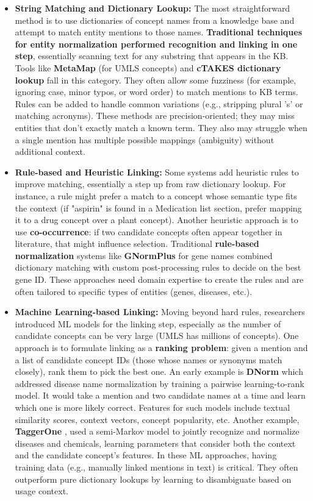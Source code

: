 \begin{itemize}
\item \textbf{String Matching and Dictionary Lookup:} The most straightforward method is to use dictionaries of concept names from a knowledge base and attempt to match entity mentions to those names. \textbf{Traditional techniques for entity normalization performed recognition and linking in one step}, essentially scanning text for any substring that appears in the KB. Tools like \textbf{MetaMap} (for UMLS concepts) and \textbf{cTAKES dictionary lookup} fall in this category. They often allow some fuzziness (for example, ignoring case, minor typos, or word order) to match mentions to KB terms. Rules can be added to handle common variations (e.g., stripping plural 's' or matching acronyms). These methods are precision-oriented; they may miss entities that don't exactly match a known term. They also may struggle when a single mention has multiple possible mappings (ambiguity) without additional context.

\item \textbf{Rule-based and Heuristic Linking:} Some systems add heuristic rules to improve matching, essentially a step up from raw dictionary lookup. For instance, a rule might prefer a match to a concept whose semantic type fits the context (if "aspirin" is found in a Medication list section, prefer mapping it to a drug concept over a plant concept). Another heuristic approach is to use \textbf{co-occurrence}: if two candidate concepts often appear together in literature, that might influence selection. Traditional \textbf{rule-based normalization} systems like \textbf{GNormPlus} for gene names combined dictionary matching with custom post-processing rules to decide on the best gene ID. These approaches need domain expertise to create the rules and are often tailored to specific types of entities (genes, diseases, etc.).

\item \textbf{Machine Learning-based Linking:} Moving beyond hard rules, researchers introduced ML models for the linking step, especially as the number of candidate concepts can be very large (UMLS has millions of concepts). One approach is to formulate linking as a \textbf{ranking problem}: given a mention and a list of candidate concept IDs (those whose names or synonyms match closely), rank them to pick the best one. An early example is \textbf{DNorm} \cite{Leaman2013} which addressed disease name normalization by training a pairwise learning-to-rank model. It would take a mention and two candidate names at a time and learn which one is more likely correct. Features for such models include textual similarity scores, context vectors, concept popularity, etc. Another example, \textbf{TaggerOne} \cite{Leaman2016}, used a semi-Markov model to jointly recognize and normalize diseases and chemicals, learning parameters that consider both the context and the candidate concept's features. In these ML approaches, having training data (e.g., manually linked mentions in text) is critical. They often outperform pure dictionary lookups by learning to disambiguate based on usage context.


\end{itemize}
